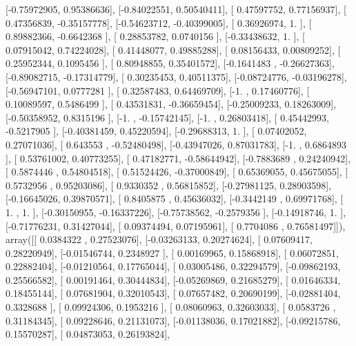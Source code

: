 \documentclass{article}
\begin{document}
       [-0.75972905,  0.95386636],
       [-0.84022551,  0.50540411],
       [ 0.47597752,  0.77156937],
       [ 0.47356839, -0.35157778],
       [-0.54623712, -0.40399005],
       [ 0.36926974,  1.        ],
       [ 0.89882366, -0.6642368 ],
       [ 0.28853782,  0.0740156 ],
       [-0.33438632,  1.        ],
       [ 0.07915042,  0.74224028],
       [ 0.41448077,  0.49885288],
       [ 0.08156433,  0.00809252],
       [ 0.25952344,  0.1095456 ],
       [ 0.80948855,  0.35401572],
       [-0.1641483 , -0.26627363],
       [-0.89082715, -0.17314779],
       [ 0.30235453,  0.40511375],
       [-0.08724776, -0.03196278],
       [-0.56947101,  0.0777281 ],
       [ 0.32587483,  0.64469709],
       [-1.        ,  0.17460776],
       [ 0.10089597,  0.5486499 ],
       [ 0.43531831, -0.36659454],
       [-0.25009233,  0.18263009],
       [-0.50358952,  0.8315196 ],
       [-1.        , -0.15742145],
       [-1.        ,  0.26803418],
       [ 0.45442993, -0.5217905 ],
       [-0.40381459,  0.45220594],
       [-0.29688313,  1.        ],
       [ 0.07402052,  0.27071036],
       [ 0.643553  , -0.52480498],
       [-0.43947026,  0.87031783],
       [-1.        ,  0.6864893 ],
       [ 0.53761002,  0.40773255],
       [ 0.47182771, -0.58644942],
       [-0.7883689 ,  0.24240942],
       [ 0.5874446 ,  0.54804518],
       [ 0.51524426, -0.37000849],
       [ 0.65369055,  0.45675055],
       [ 0.5732956 ,  0.95203086],
       [ 0.9330352 ,  0.56815852],
       [-0.27981125,  0.28903598],
       [-0.16645026,  0.39870571],
       [ 0.8405875 ,  0.45636032],
       [-0.3442149 ,  0.69971768],
       [ 1.        ,  1.        ],
       [-0.30150955, -0.16337226],
       [-0.75738562, -0.2579356 ],
       [-0.14918746,  1.        ],
       [-0.71776231,  0.31427044],
       [ 0.09374494,  0.07195961],
       [ 0.7704086 ,  0.76581497]]), array([[ 0.0384322 ,  0.27523076],
       [-0.03263133,  0.20274624],
       [ 0.07609417,  0.28220949],
       [-0.01546744,  0.2348927 ],
       [ 0.00169965,  0.15868918],
       [ 0.06072851,  0.22882404],
       [-0.01210564,  0.17765044],
       [ 0.03005486,  0.32294579],
       [-0.09862193,  0.25566582],
       [ 0.00191464,  0.30444834],
       [-0.05269869,  0.21685279],
       [ 0.01646334,  0.18455144],
       [ 0.07681904,  0.32010543],
       [ 0.07657482,  0.20690199],
       [-0.02881404,  0.3328688 ],
       [ 0.09924306,  0.1953216 ],
       [ 0.08060963,  0.32603033],
       [ 0.0583726 ,  0.31184345],
       [ 0.09228646,  0.21131073],
       [-0.01138036,  0.17021882],
       [-0.09215786,  0.15570287],
       [ 0.04873053,  0.26193824],
\end{document}
